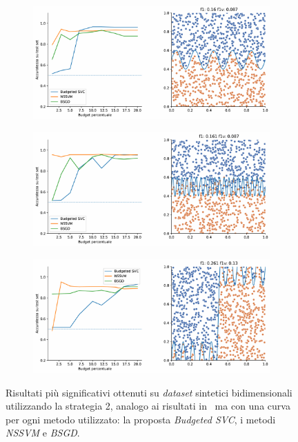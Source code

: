\begin{figure}[ht]\ContinuedFloat
\centering
    \begin{subfigure}{.8\textwidth}
        \centering
        \includegraphics[width=\textwidth]{img/comp_new/12.pdf}
    \end{subfigure}
    \hfill
    \begin{subfigure}{.8\textwidth}
        \centering
        \includegraphics[width=\textwidth]{img/comp_new/14.pdf}
    \end{subfigure}
    \hfill
    \begin{subfigure}{.8\textwidth}
        \centering
        \includegraphics[width=\textwidth]{img/comp_new/15.pdf}
    \end{subfigure}
    \caption[Risultati su \emph{dataset} sintetici utilizzando strategia 2 in confronto ad altri metodi.]{Risultati più significativi ottenuti su \emph{dataset} sintetici bidimensionali utilizzando la strategia 2, analogo ai risultati in~ ma con una curva per ogni metodo utilizzato: la proposta \emph{Budgeted SVC}, i metodi \emph{NSSVM} e \emph{BSGD}.}
\label{fig:comp_new}
\end{figure}
